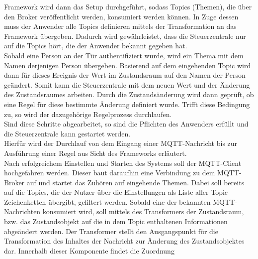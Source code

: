         Framework wird dann das Setup durchgeführt, sodass Topics (Themen), die über den Broker veröffentlicht werden, konsumiert 
        werden können. In Zuge dessen muss der Anwender alle Topics definieren mittels der Transformation an das Framework übergeben. Dadurch wird gewährleistet, dass 
        die Steuerzentrale nur auf die Topics hört, die der Anwender bekannt gegeben hat. %
        \\
        Sobald eine Person an der Tür authentifiziert wurde, wird ein Thema mit dem Namen derjenigen Person übergeben. Basierend auf 
        dem eingehenden Topic wird dann für dieses Ereignis der Wert im Zustandsraum auf den Namen der Person geändert. Somit kann 
        die Steuerzentrale mit dem neuen Wert und der Änderung des Zustandsraumes arbeiten. Durch die Zustandsänderung wird dann 
        geprüft, ob eine Regel für diese bestimmte Änderung definiert wurde. Trifft diese Bedingung zu, so wird der dazugehörige Regelprozess 
        durchlaufen.  
        \\
        \linebreak
        Sind diese Schritte abgearbeitet, so sind die Pflichten des Anwenders erfüllt und die Steuerzentrale kann gestartet werden. 
        \\
        Hierfür wird der Durchlauf von dem Eingang einer \acs{MQTT}-Nachricht bis zur Ausführung einer Regel aus Sicht des Frameworks 
        erläutert.
        \\
        \linebreak
        Nach erfolgreichem Einstellen und Starten des Systems soll der \acs{MQTT}-Client hochgefahren werden. Dieser baut daraufhin eine 
        Verbindung zu dem \acs{MQTT}-Broker auf und startet das Zuhören auf eingehende Themen. Dabei soll bereits auf die Topics,  
        die der Nutzer über die Einstellungen als Liste aller Topic-Zeichenketten übergibt, gefiltert werden. Sobald eine der bekannten 
        \acs{MQTT}-Nachrichten konsumiert wird, soll mittels des Transformers der Zustandsraum, bzw. das Zustandsobjekt 
        auf die in dem Topic enthaltenen Informationen abgeändert werden. Der Transformer stellt den Ausgangspunkt für die Transformation 
        des Inhaltes der Nachricht zur Änderung des Zustandsobjektes dar. Innerhalb dieser Komponente findet die Zuordnung 
